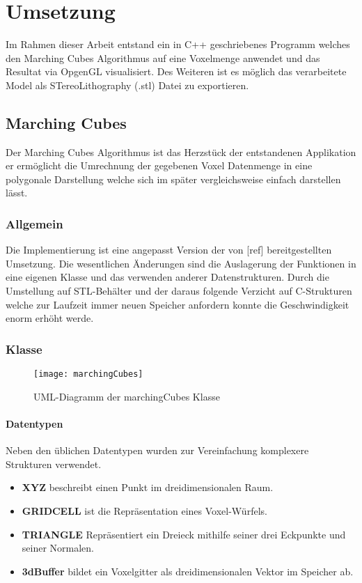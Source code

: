\chapter{Umsetzung}
Im Rahmen dieser Arbeit entstand ein in C++ geschriebenes Programm welches den Marching Cubes Algorithmus auf eine Voxelmenge anwendet und das Resultat via OpgenGL visualisiert. Des Weiteren ist es möglich das verarbeitete Model als STereoLithography (.stl) Datei zu exportieren.
\section{Marching Cubes}
Der Marching Cubes Algorithmus ist das Herzstück der entstandenen Applikation er ermöglicht die Umrechnung der gegebenen Voxel Datenmenge in eine polygonale Darstellung welche sich im später vergleichsweise einfach darstellen lässt.
\subsection{Allgemein}
Die Implementierung ist eine angepasst Version der von [ref] bereitgestellten Umsetzung. Die wesentlichen Änderungen sind die Auslagerung der Funktionen in eine eigenen Klasse und das verwenden anderer Datenstrukturen. Durch die Umstellung auf STL-Behälter und der daraus folgende Verzicht auf C-Strukturen welche zur Laufzeit immer neuen Speicher anfordern konnte die Geschwindigkeit enorm erhöht werde.
\subsection{Klasse}
\begin{figure}[H]
	\centering
	\texttt{[image: marchingCubes]}
	\caption{UML-Diagramm der marchingCubes Klasse}
	\label{fig:marchingCubes}
\end{figure}

\subsubsection{Datentypen}
Neben den üblichen Datentypen wurden zur Vereinfachung komplexere Strukturen verwendet.\\
\begin{itemize}
	\item \textbf{XYZ} beschreibt einen Punkt im dreidimensionalen Raum.
	\item \textbf{GRIDCELL} ist die Repräsentation eines Voxel-Würfels. 
	\item \textbf{TRIANGLE} Repräsentiert ein Dreieck mithilfe seiner drei Eckpunkte und seiner Normalen.
	\item \textbf{3dBuffer} bildet ein Voxelgitter als dreidimensionalen Vektor im Speicher ab.
\end{itemize}
